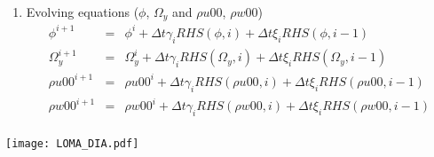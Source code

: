\documentclass[titlepage,11pt]{article}
\begin{document}
\begin{enumerate}
\item Evolving equations ($\phi$, $\Omega_y$ and $\rho u00$, $\rho w00$)
		\begin{equation}
			\begin{array}{lcl}
			\phi^{i+1}&=&\phi^{i}+\Delta t \gamma_i RHS(\phi,i)+\Delta t \xi_i RHS(\phi,i-1) \\
			\Omega_y^{i+1}&=&\Omega_y^{i}+\Delta t \gamma_i RHS(\Omega_y,i)+\Delta t \xi_i RHS(\Omega_y,i-1)\\
			\rho u00^{i+1}&=&\rho u00^{i}+\Delta t \gamma_i RHS(\rho u00 ,i)+\Delta t \xi_i RHS(\rho u00,i-1) \\
			\rho w00^{i+1}&=&\rho w00^{i}+\Delta t \gamma_i RHS(\rho w00 ,i)+\Delta t \xi_i RHS(\rho w00,i-1) \\
			\end{array}
		\end{equation}

\end{enumerate}





\newpage
\texttt{[image: LOMA\_DIA.pdf]}







\end{document}
